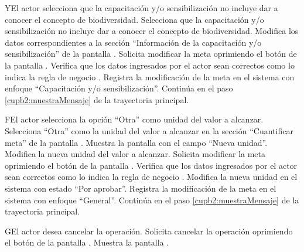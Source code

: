 \begin{UCtrayectoriaA}{Y}{El actor selecciona que la capacitación y/o sensibilización no incluye dar a conocer el concepto de biodiversidad.}
	\UCpaso[\UCactor] Selecciona que la capacitación y/o sensibilización no incluye dar a conocer el concepto de biodiversidad.
	\UCpaso[\UCactor] Modifica los datos correspondientes a la sección ``Información de la capacitación y/o sensibilización'' de la pantalla .
	\UCpaso[\UCactor] Solicita modificar la meta oprimiendo el botón  de la pantalla .  
	\UCpaso[\UCsist] Verifica que los datos ingresados por el actor sean correctos como lo indica la regla de negocio .   
	\UCpaso[\UCsist] Registra la modificación de la meta en el sistema con enfoque ``Capacitación y/o sensibilización''.
	\UCpaso[] Continúa en el paso \ref{cupb2:muestraMensaje} de la trayectoria principal.
\end{UCtrayectoriaA}

\begin{UCtrayectoriaA}{F}{El actor selecciona la opción ``Otra'' como unidad del valor a alcanzar.}
	\UCpaso[\UCactor] Selecciona ``Otra'' como la unidad del valor a alcanzar en la sección ``Cuantificar meta'' de la pantalla .
	\UCpaso[\UCsist] Muestra la pantalla   con el campo ``Nueva unidad''.
	\UCpaso[\UCactor] Modifica la nueva unidad del valor a alcanzar.
	\UCpaso[\UCactor] Solicita modificar la meta oprimiendo el botón  de la pantalla .  
	\UCpaso[\UCsist] Verifica que los datos ingresados por el actor sean correctos como lo indica la regla de negocio .   
	\UCpaso[\UCsist] Modifica la nueva unidad en el sistema con estado ``Por aprobar''.
	\UCpaso[\UCsist] Registra la modificación de la meta en el sistema con enfoque ``General''.
	\UCpaso[] Continúa en el paso \ref{cupb2:muestraMensaje} de la trayectoria principal.
\end{UCtrayectoriaA} 

\begin{UCtrayectoriaA}{G}{El actor desea cancelar la operación.}
	\UCpaso[\UCactor] Solicita cancelar la operación oprimiendo el botón  de la pantalla .
	\UCpaso[\UCsist] Muestra la pantalla  .
\end{UCtrayectoriaA} 

